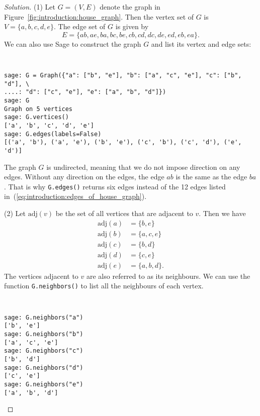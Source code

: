 \begin{proof}[Solution]
(1) Let $G = (V, E)$ denote the graph in
Figure~\ref{fig:introduction:house_graph}. Then the vertex set of $G$
is $V = \{ a, b, c, d, e \}$. The edge set of $G$ is given by
\begin{equation}
\label{eq:introduction:edges_of_house_graph}
E
=
\{ ab, ae, ba, bc, be, cb, cd, dc, de, ed, eb, ea \}.
\end{equation}
We can also use Sage to construct the graph $G$ and list its vertex
and edge sets:
%
\begin{center}
\fontsize{9pt}{9pt}
\selectfont
\tt
\begin{lstlisting}
sage: G = Graph({"a": ["b", "e"], "b": ["a", "c", "e"], "c": ["b", "d"], \
....: "d": ["c", "e"], "e": ["a", "b", "d"]})
sage: G
Graph on 5 vertices
sage: G.vertices()
['a', 'b', 'c', 'd', 'e']
sage: G.edges(labels=False)
[('a', 'b'), ('a', 'e'), ('b', 'e'), ('c', 'b'), ('c', 'd'), ('e', 'd')]
\end{lstlisting}
\end{center}
%
The graph $G$ is undirected, meaning that we do not impose direction
on any edges. Without any direction on the edges, the edge $ab$ is the
same as the edge $ba$. That is why \texttt{G.edges()} returns six
edges instead of the 12 edges listed
in~(\ref{eq:introduction:edges_of_house_graph}).

(2) Let $\text{adj}(v)$ be the set of all vertices that are adjacent
to $v$. Then we have
%
\begin{align*}
\text{adj}(a) &= \{ b, e \} \\
\text{adj}(b) &= \{ a, c, e \} \\
\text{adj}(c) &= \{ b, d \} \\
\text{adj}(d) &= \{ c, e \} \\
\text{adj}(e) &= \{ a, b, d \}.
\end{align*}
%
The vertices adjacent to $v$ are also referred to as its
neighbours. We can use the function \texttt{G.neighbors()} to list all
the neighbours of each vertex.
%
\begin{center}
\fontsize{9pt}{9pt}
\selectfont
\tt
\begin{lstlisting}
sage: G.neighbors("a")
['b', 'e']
sage: G.neighbors("b")
['a', 'c', 'e']
sage: G.neighbors("c")
['b', 'd']
sage: G.neighbors("d")
['c', 'e']
sage: G.neighbors("e")
['a', 'b', 'd']
\end{lstlisting}
\end{center}


\end{proof}
